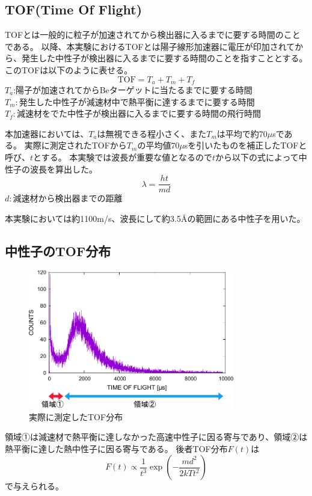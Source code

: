 \subsection{TOF(Time Of Flight)}
TOFとは一般的に粒子が加速されてから検出器に入るまでに要する時間のことである。
以降、本実験におけるTOFとは陽子線形加速器に電圧が印加されてから、発生した中性子が検出器に入るまでに要する時間のことを指すこととする。
このTOFは以下のように表せる。
\[
\mathrm{TOF}=T_a+T_m+T_f
\]
$T_a$:陽子が加速されてからBeターゲットに当たるまでに要する時間\\
$T_m:発生した中性子が減速材中で熱平衡に達するまでに要する時間$\\
$T_f:減速材をでた中性子が検出器に入るまでに要する時間の飛行時間$

本加速器においては、$T_a$は無視できる程小さく、また$T_m$は平均で約70$\mu$sである。
実際に測定されたTOFから$T_m$の平均値70$\mu$sを引いたものを補正したTOFと呼び、$t$とする。
本実験では波長が重要な値となるので$t$から以下の式によって中性子の波長を算出した。
\begin{equation}
{\lambda}={\frac{ht}{md}}
\end{equation}
$d:減速材から検出器までの距離$

本実験においては約1100m/s、波長にして約3.5Åの範囲にある中性子を用いた。
\subsection{中性子のTOF分布}
\begin{figure}[H]
\centering
\includegraphics[width=9cm]{accelerator/TOF1.pdf}
\caption{実際に測定したTOF分布}
\end{figure}
領域①は減速材で熱平衡に達しなかった高速中性子に因る寄与であり、領域②は熱平衡に達した熱中性子に因る寄与である。
後者TOF分布$F(t)$は\begin{equation}F(t)\propto \frac{1}{t^{3}}\exp\left(-\frac{md^2}{2kTt^2}\right) \end{equation}で与えられる。

